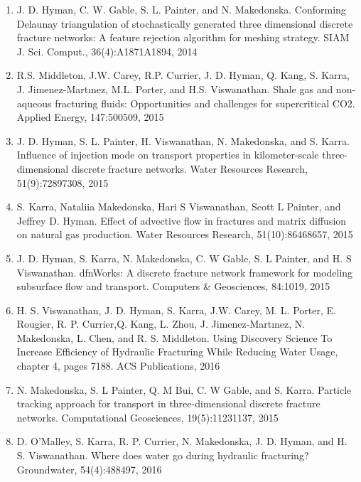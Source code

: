 \documentclass[letterpaper,10pt,english]{sphinxmanual}
\begin{document}
\begin{enumerate}
\item {} 
J. D. Hyman, C. W. Gable, S. L. Painter, and N. Makedonska. Conforming Delaunay triangulation of stochastically generated three dimensional discrete fracture networks: A feature rejection algorithm for meshing strategy. SIAM J. Sci. Comput., 36(4):A1871\textendash{}A1894, 2014

\item {} 
R.S. Middleton, J.W. Carey, R.P. Currier, J. D. Hyman, Q. Kang, S. Karra, J. Jimenez-Martınez, M.L. Porter, and H.S. Viswanathan. Shale gas and non-aqueous fracturing fluids: Opportunities and challenges for supercritical CO2. Applied Energy, 147:500\textendash{}509, 2015

\item {} 
J. D. Hyman, S. L. Painter, H. Viswanathan, N. Makedonska, and S. Karra. Influence of injection mode on transport properties in kilometer-scale three-dimensional discrete fracture networks. Water Resources Research, 51(9):7289\textendash{}7308, 2015

\item {} 
S. Karra, Nataliia Makedonska, Hari S Viswanathan, Scott L Painter, and Jeffrey D. Hyman. Effect of advective flow in fractures and matrix diffusion on natural gas production. Water Resources Research, 51(10):8646\textendash{}8657, 2015

\item {} 
J. D. Hyman, S. Karra, N. Makedonska, C. W Gable, S. L Painter, and H. S Viswanathan. dfnWorks: A discrete fracture network framework for modeling subsurface flow and transport. Computers \& Geosciences, 84:10\textendash{}19, 2015

\item {} 
H. S. Viswanathan, J. D. Hyman, S. Karra, J.W. Carey, M. L. Porter, E. Rougier, R. P. Currier,Q. Kang, L. Zhou, J. Jimenez-Martınez, N. Makedonska, L. Chen, and R. S. Middleton. Using Discovery Science To Increase Efficiency of Hydraulic Fracturing While Reducing Water Usage, chapter 4, pages 71\textendash{}88. ACS Publications, 2016

\item {} 
N. Makedonska, S. L Painter, Q. M Bui, C. W Gable, and S. Karra. Particle tracking approach for transport in three-dimensional discrete fracture networks. Computational Geosciences, 19(5):1123\textendash{}1137, 2015

\item {} 
D. O’Malley, S. Karra, R. P. Currier, N. Makedonska, J. D. Hyman, and H. S. Viswanathan. Where does water go during hydraulic fracturing? Groundwater, 54(4):488\textendash{}497, 2016


\end{enumerate}
\end{document}
